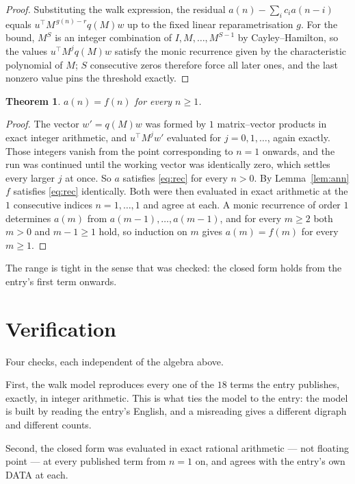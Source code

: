 \documentclass[11pt,a4paper]{article}
\theoremstyle{plain}
\newtheorem{theorem}{Theorem}
\theoremstyle{definition}
\begin{document}
\begin{proof}
Substituting the walk expression, the residual $a(n)-\sum_ic_ia(n-i)$ equals
$u^{\!\top}M^{\,g(n)-r}q(M)w$ up to the fixed linear reparametrisation $g$. For the bound,
$M^{S}$ is an integer combination of $I,M,\dots,M^{S-1}$ by Cayley--Hamilton, so the values
$u^{\!\top}M^{j}q(M)w$ satisfy the monic recurrence given by the characteristic polynomial of
$M$; $S$ consecutive zeros therefore force all later ones, and the last nonzero value pins the
threshold exactly.
\end{proof}

\begin{theorem}
$a(n)=f(n)$ for every $n\ge1$.
\end{theorem}

\begin{proof}
The vector $w'=q(M)w$ was formed by $1$ matrix--vector products in exact integer
arithmetic, and $u^{\!\top}M^{j}w'$ evaluated for $j=0,1,\dots$, again exactly. Those integers
vanish from the point corresponding to $n=1$ onwards, and the run was continued until the
working vector was identically zero, which settles every larger $j$ at once. So $a$ satisfies
\eqref{eq:rec} for every $n>0$. By Lemma~\ref{lem:ann} $f$ satisfies \eqref{eq:rec}
identically. Both were then evaluated in exact arithmetic at the $1$ consecutive indices
$n=1,\dots,1$ and agree at each. A monic recurrence of order $1$
determines $a(m)$ from $a(m-1),\dots,a(m-1)$, and for every $m\ge2$ both
$m>0$ and $m-1\ge1$ hold, so induction on $m$ gives $a(m)=f(m)$ for every
$m\ge1$.
\end{proof}

The range is tight in the sense that was checked: the closed form holds from the entry's first term onwards.

\section{Verification}

Four checks, each independent of the algebra above.

First, the walk model reproduces every one of the $18$ terms the entry publishes,
exactly, in integer arithmetic. This is what ties the model to the entry: the model is built
by reading the entry's English, and a misreading gives a different digraph and different
counts.

Second, the closed form was evaluated in exact rational arithmetic --- not floating point ---
at every published term from $n=1$ on, and agrees with the entry's own DATA at each.
\end{document}
